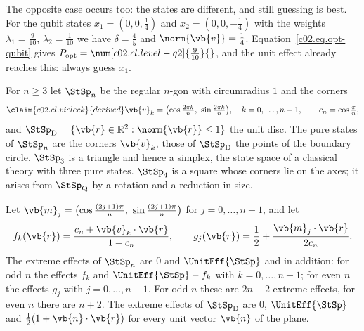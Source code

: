 The opposite case occurs too: the states are different, and still guessing is best. For
the qubit states $x_1 = (0, 0, \tfrac14)$ and $x_2 = (0, 0, -\tfrac14)$ with the weights
$\lambda_1 = \tfrac{9}{10}$, $\lambda_2 = \tfrac{1}{10}$ we have $\delta = \tfrac45$ and
$\norm{\vb{v}} = \tfrac14$. Equation~\eqref{c02.eq.opt-qubit} gives
$P_{\mathrm{opt}} = \num[c02.cl.level-q2]{\tfrac{9}{10}}{}$, and the unit effect already
reaches this: always guess $x_1$.

\begin{vertiefung}[id=c02.v5,
    titel={Polygons and the disc},
    wozu={Between the square and the ball lies a whole family of state spaces in the
      plane. It shows how the distinguishability of pure states depends on the shape of
      the state space, and what can be said about the relation of the two cones.},
    voraussetzung={Core up to Corollary~\ref{c02.cor.rein}; for the last part
      block~\ref{c02.v2}. The core does not need this block.},
    zurueck={Whether two pure states can be told apart with certainty depends on the shape
      of the state space and not only on the two points.}]
  For $n \geq 3$ let $\StSp_n$ be the regular $n$-gon with circumradius $1$ and the corners
  \begin{equation}\label{c02.eq.vieleck}\claim{c02.cl.vieleck}{derived}
    \vb{v}_k = \bigl(\cos\tfrac{2\pi k}{n},\ \sin\tfrac{2\pi k}{n}\bigr), \quad k = 0, \dots, n-1,
    \qquad c_n = \cos\tfrac{\pi}{n} ,
  \end{equation}
  and $\StSp_{\mathrm{D}} = \{ \vb{r} \in \mathbb{R}^2 : \norm{\vb{r}} \leq 1 \}$ the unit
  disc. The pure states of $\StSp_n$ are the corners $\vb{v}_k$, those of
  $\StSp_{\mathrm{D}}$ the points of the boundary circle. $\StSp_3$ is a triangle and hence
  a simplex, the state space of a classical theory with three pure states. $\StSp_4$ is a
  square whose corners lie on the axes; it arises from $\StSp_{\mathrm{Q}}$ by a rotation
  and a reduction in size.

  \begin{proposition}\label{c02.prop.vieleck}
    Let $\vb{m}_j = \bigl(\cos\tfrac{(2j+1)\pi}{n},\ \sin\tfrac{(2j+1)\pi}{n}\bigr)$ for
    $j = 0, \dots, n-1$, and let
    \begin{equation}\label{c02.eq.vieleck-effekte}
      f_k(\vb{r}) = \frac{c_n + \vb{v}_k\cdot\vb{r}}{1 + c_n},
      \qquad
      g_j(\vb{r}) = \frac12 + \frac{\vb{m}_j\cdot\vb{r}}{2 c_n} .
    \end{equation}
    The extreme effects of $\StSp_n$ are $0$ and $\UnitEff{\StSp}$ and in addition: for
    odd $n$ the effects $f_k$ and $\UnitEff{\StSp} - f_k$ with $k = 0, \dots, n-1$; for
    even $n$ the effects $g_j$ with $j = 0, \dots, n-1$.
    For odd $n$ these are $2n + 2$ extreme effects, for even $n$ there are $n + 2$.
    The extreme effects of $\StSp_{\mathrm{D}}$ are $0$, $\UnitEff{\StSp}$ and
    $\tfrac12(1 + \vb{n}\cdot\vb{r})$ for every unit vector $\vb{n}$ of the plane.
  \end{proposition}


\end{vertiefung}

